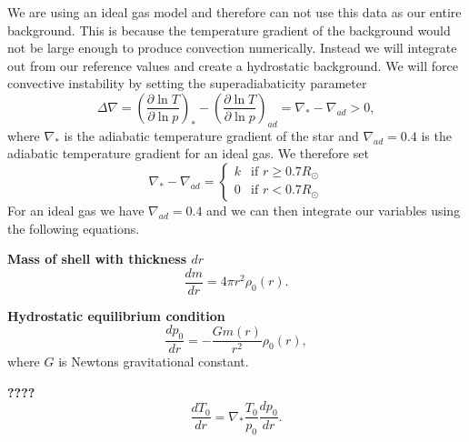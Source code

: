 We are using an ideal gas model and therefore can not use this data as our entire background. This is because the temperature gradient of the background would not be large enough to produce convection numerically. Instead we will integrate out from our reference values and create a hydrostatic background. We will force convective instability by setting the superadiabaticity parameter 
    \begin{equation*}
        \Delta\nabla = \left(\frac{\partial\ln T}{\partial\ln p} \right)_{*} - \left(\frac{\partial\ln T}{\partial\ln p} \right)_{ad} = \nabla_{*} -\nabla_{ad} > 0,
    \end{equation*}
where $\nabla_{*}$ is the adiabatic temperature gradient of the star and $\nabla_{ad}=0.4$ is the adiabatic temperature gradient for an ideal gas. We therefore set 
    \begin{equation*}
    \nabla_{*} -\nabla_{ad} = 
        \begin{cases} 
        k & \text{if } r \geq 0.7 R_{\odot} \\
        0 & \text{if } r < 0.7 R_{\odot}
        \end{cases}
    \end{equation*}
For an ideal gas we have $\nabla_{ad}=0.4$ and we can then integrate our variables using the following equations.

\textbf{Mass of shell with thickness $dr$}
\begin{equation}\label{eq:mass_shell}
    \frac{dm}{dr} = 4\pi r^2\rho_0(r).
\end{equation}

\textbf{Hydrostatic equilibrium condition}
    \begin{equation}\label{eq:hydrostatic_equilibrium}
        \frac{dp_0}{dr} = -\frac{G m(r)}{r^2}\rho_0(r),
    \end{equation}
where $G$ is Newtons gravitational constant.

\textbf{????}
    \begin{equation}\label{eq:dT_dr}
        \frac{d T_0}{d r} = \nabla_{*} \frac{T_0}{p_0}\frac{d p_0}{d r}. 
    \end{equation}

